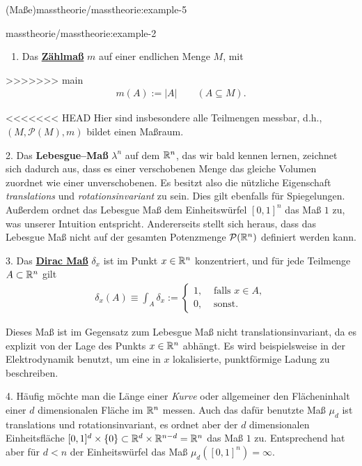 \begin{example}{(Maße)}{masstheorie/masstheorie:example-5}
\begin{example}{}{masstheorie/masstheorie:example-2}
\begin{enumerate}
\item {} 
\par
Das \href{https://de.wikipedia.org/wiki/Z\%c3\%a4hlma\%c3\%9f\_(Ma\%c3\%9ftheorie)}{\textbf{Zählmaß}} \(m\) auf einer endlichen Menge \(M\), mit

\end{enumerate}
>>>>>>> main
\begin{align*}
m(A):=|A|\qquad (A\subseteq M).
\end{align*}
\par
<<<<<<< HEAD
Hier sind insbesondere alle Teilmengen messbar, d.h., \((M, \mathcal{P}(M), m)\) bildet einen Maßraum.

\par
2. Das \textbf{Lebesgue–Maß} \(\lambda^n\) auf dem \(\mathbb{R}^n\), das wir bald kennen lernen, zeichnet sich dadurch aus, dass es einer verschobenen Menge das gleiche Volumen zuordnet wie einer unverschobenen.
Es besitzt also die nützliche Eigenschaft \emph{translations } und \emph{rotationsinvariant} zu sein.
Dies gilt ebenfalls für Spiegelungen.
Außerdem ordnet das Lebesgue Maß dem Einheitswürfel \([0,1]^n\) das Maß \(1\) zu, was unserer Intuition entspricht.
Andererseits stellt sich heraus, dass das Lebesgue Maß nicht auf der gesamten Potenzmenge \(\mathcal{P}(\mathbb{R}^n)\) definiert werden kann.

\par
3. Das \href{https://de.wikipedia.org/wiki/Diracma\%c3\%9f}{\textbf{Dirac Maß}} \(\delta_x\) ist im Punkt \(x \in \mathbb{R}^n\) konzentriert, und für jede Teilmenge \(A\subset\mathbb{R}^n\) gilt
\begin{align*}
\delta_x(A) \equiv \int_A\delta_x := \begin{cases} 1, &  \text{ falls } x \in A,\\ 0, & \text{ sonst}. \end{cases}
\end{align*}
\par
Dieses Maß ist im Gegensatz zum Lebesgue Maß nicht translationsinvariant, da es explizit von der Lage des Punkts \(x\in\mathbb{R}^n\) abhängt.
Es wird beispielsweise in der Elektrodynamik benutzt, um eine in \(x\) lokalisierte, punktförmige Ladung zu beschreiben.

\par
4. Häufig möchte man die Länge einer \emph{Kurve} oder allgemeiner den Flächeninhalt einer \(d\) dimensionalen Fläche im \(\mathbb{R}^n\) messen.
Auch das dafür benutzte Maß \(\mu_d\) ist translations  und rotationsinvariant, es ordnet aber der \(d\) dimensionalen Einheitsfläche \([0,1]^d\times\{0\} \subset\mathbb{R}^d\times\mathbb{R}^{n-d}=\mathbb{R}^n\) das Maß \(1\) zu.
Entsprechend hat aber für \(d<n\) der Einheitswürfel das Maß \(\mu_d([0,1]^n)=\infty\).


\end{example}
\end{example}

